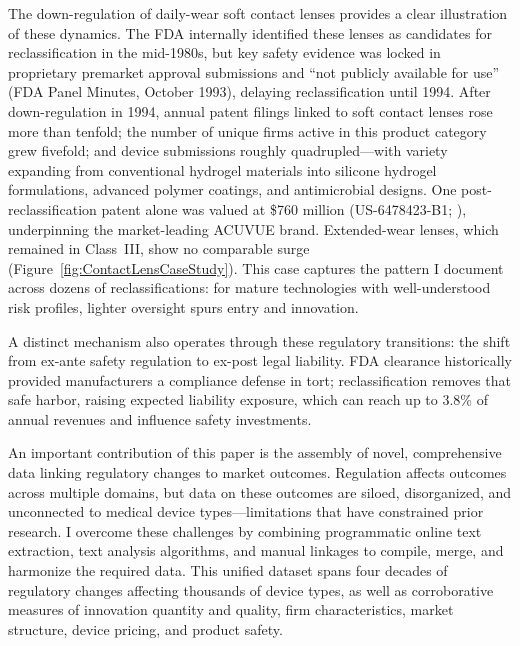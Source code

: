 \documentclass[letterpaper,12pt]{article}
\theoremstyle{definition}
\begin{document}
The down-regulation of daily-wear soft contact lenses provides a clear illustration of these dynamics. The FDA internally identified these lenses as candidates for reclassification in the mid-1980s, but key safety evidence was locked in proprietary premarket approval submissions and ``not publicly available for use'' (FDA Panel Minutes, October 1993), delaying reclassification until 1994. After down-regulation in 1994, annual patent filings linked to soft contact lenses rose more than tenfold; the number of unique firms active in this product category grew fivefold; and device submissions roughly quadrupled---with variety expanding from conventional hydrogel materials into silicone hydrogel formulations, advanced polymer coatings, and antimicrobial designs. One post-reclassification patent alone was valued at \$760 million (US-6478423-B1; \citealp{kogan:2017}), underpinning the market-leading ACUVUE brand. Extended-wear lenses, which remained in Class~III, show no comparable surge (Figure~\ref{fig:ContactLensCaseStudy}). This case captures the pattern I document across dozens of reclassifications: for mature technologies with well-understood risk profiles, lighter oversight spurs entry and innovation.

A distinct mechanism also operates through these regulatory transitions: the shift from ex-ante safety regulation to ex-post legal liability. FDA clearance historically provided manufacturers a compliance defense in tort; reclassification removes that safe harbor, raising expected liability exposure, which can reach up to 3.8\% of annual revenues \citep{MckinseyCostSafety:2018} and influence safety investments.\footnotemark{} 


An important contribution of this paper is the assembly of novel, comprehensive data linking regulatory changes to market outcomes. Regulation affects outcomes across multiple domains, but data on these outcomes are siloed, disorganized, and unconnected to medical device types---limitations that have constrained prior research. I overcome these challenges by combining programmatic online text extraction, text analysis algorithms, and manual linkages to compile, merge, and harmonize the required data. This unified dataset spans four decades of regulatory changes affecting thousands of device types, as well as corroborative measures of innovation quantity and quality, firm characteristics, market structure, device pricing, and product safety.
\end{document}
